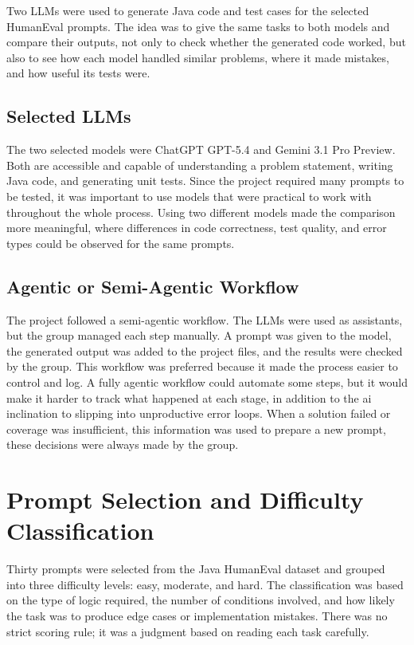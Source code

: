 \documentclass[journal]{IEEEtran}
\begin{document}
Two LLMs were used to generate Java code and test cases for the selected HumanEval prompts. The idea was to give the same tasks to both models and compare their outputs, not only to check whether the generated code worked, but also to see how each model handled similar problems, where it made mistakes, and how useful its tests were.


\subsection{Selected LLMs}
The two selected models were ChatGPT GPT-5.4 and Gemini 3.1 Pro Preview. Both are accessible and capable of understanding a problem statement, writing Java code, and generating unit tests. Since the project required many prompts to be tested, it was important to use models that were practical to work with throughout the whole process. Using two different models made the comparison more meaningful, where differences in code correctness, test quality, and error types could be observed for the same prompts.

\subsection{Agentic or Semi-Agentic Workflow}
The project followed a semi-agentic workflow. The LLMs were used as assistants, but the group managed each step manually. A prompt was given to the model, the generated output was added to the project files, and the results were checked by the group. This workflow was preferred because it made the process easier to control and log. A fully agentic workflow could automate some steps, but it would make it harder to track what happened at each stage, in addition to the ai inclination to slipping into unproductive error loops. When a solution failed or coverage was insufficient, this information was used to prepare a new prompt, these decisions were always made by the group.

\section{Prompt Selection and Difficulty Classification}
Thirty prompts were selected from the Java HumanEval dataset and grouped into three difficulty levels: easy, moderate, and hard. The classification was based on the type of logic required, the number of conditions involved, and how likely the task was to produce edge cases or implementation mistakes. There was no strict scoring rule; it was a judgment based on reading each task carefully.
\end{document}
